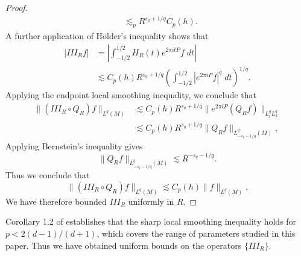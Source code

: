 \begin{proof}
\begin{align*}
        &\lesssim_p R^{s_q + 1/q} C_p(h).
    \end{align*}
    A further application of H\"{o}lder's inequality shows that
    \begin{align*}
        | III_R f | &= \left| \int_{-1/2}^{1/2} H_R(t) e^{2 \pi i t P} f\; dt \right|\\
        &\lesssim C_p(h) R^{s_q + 1/q} \left( \int_{-1/2}^{1/2} |e^{2 \pi i P} f|^{q}\; dt \right)^{1/q}.
    \end{align*}
    Applying the endpoint local smoothing inequality, we conclude that
    \begin{align*}
        \| (III_R \circ Q_R)f \|_{L^{q}(M)} &\lesssim C_p(h) R^{s_q + 1/q} \| e^{2 \pi i P} (Q_R f) \|_{L^{q}_t L^{q}_x}\\
        &\lesssim C_p(h) R^{s_q + 1/q} \| Q_R f \|_{L^{q}_{-s_q - 1/q}(M)},
    \end{align*}
    Applying Bernstein's inequality gives
    \[ \| Q_R f \|_{L^{q}_{-s_q - 1/q}(M)} \lesssim R^{-s_q - 1/q}. \]
    Thus we conclude that
    \[ \| (III_R \circ Q_R) f \|_{L^{q}(M)} \lesssim C_p(h) \| f \|_{L^{q}(M)}. \]
    We have therefore bounded $III_R$ uniformly in $R$.
\end{proof}

Corollary 1.2 of \cite{LeeSeeger} establishes that the sharp local smoothing inequality holds for $p < 2(d-1)/(d+1)$, which covers the range of parameters studied in this paper. Thus we have obtained uniform bounds on the operators $\{ III_R \}$.

